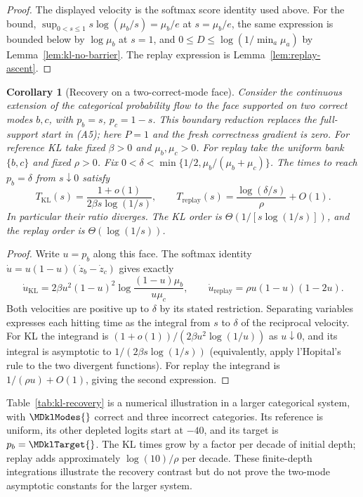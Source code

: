 \documentclass{article}
\newcommand{\1}{\mathbf 1}
\newtheorem{corollary}[lemma]{Corollary}
\theoremstyle{remark}
\theoremstyle{definition}
\theoremstyle{plain}
\begin{document}
\begin{proof}
The displayed velocity is the softmax score identity used above. For the
bound, $\sup_{0<s\le1}s\log(\mu_b/s)=\mu_b/e$ at $s=\mu_b/e$, the same
expression is bounded below by $\log\mu_b$ at $s=1$, and $0\le D\le
\log(1/\min_a\mu_a)$ by Lemma~\ref{lem:kl-no-barrier}. The replay expression is
Lemma~\ref{lem:replay-ascent}.
\end{proof}

\begin{corollary}[Recovery on a two-correct-mode face]
\label{cor:kl-recovery-time}
Consider the continuous extension of the categorical probability flow to
the face supported on two correct modes $b,c$, with $p_b=s$, $p_c=1-s$.
This boundary reduction replaces the full-support start in (A5); here $P=1$
and the fresh correctness gradient is zero. For reference KL take fixed
$\beta>0$ and $\mu_b,\mu_c>0$. For replay take the uniform bank $\{b,c\}$
and fixed $\rho>0$. Fix
$0<\delta<\min\{1/2,\mu_b/(\mu_b+\mu_c)\}$.
The times to reach $p_b=\delta$ from $s\downarrow0$ satisfy
\[
 T_{\mathrm{KL}}(s)
 =\frac{1+o(1)}{2\beta s\log(1/s)},\qquad
 T_{\mathrm{replay}}(s)
 =\frac{\log(\delta/s)}{\rho}+O(1).
\]
In particular their ratio diverges. The KL order is
$\Theta(1/[s\log(1/s)])$, and the replay order is
$\Theta(\log(1/s))$.
\end{corollary}
\begin{proof}
Write $u=p_b$ along this face. The softmax identity
$\dot u=u(1-u)(\dot z_b-\dot z_c)$ gives exactly
\[
 \dot u_{\mathrm{KL}}
 =2\beta u^2(1-u)^2\log\frac{(1-u)\mu_b}{u\mu_c},
 \qquad
 \dot u_{\mathrm{replay}}
 =\rho u(1-u)(1-2u).
\]
Both velocities are positive up to $\delta$ by its stated restriction.
Separating variables expresses each hitting time as the integral from
$s$ to $\delta$ of the reciprocal velocity. For KL the integrand is
$(1+o(1))/(2\beta u^2\log(1/u))$ as $u\downarrow0$, and its integral is
asymptotic to $1/(2\beta s\log(1/s))$ (equivalently, apply
l'Hopital's rule to the two divergent functions). For replay the integrand
is $1/(\rho u)+O(1)$, giving the second expression.
\end{proof}

Table~\ref{tab:kl-recovery} is a numerical illustration in a larger
categorical system, with $\MDklModes{}$ correct and three incorrect categories.
Its reference is uniform, its other depleted logits start at $-40$, and its
target is $p_b=\MDklTarget{}$. The KL times grow by a factor
\MDklDecadeKL{} per decade of initial depth; replay adds approximately
$\log(10)/\rho$ per decade. These finite-depth integrations illustrate the
recovery contrast but do not prove the two-mode asymptotic constants for
the larger system.
\end{document}

